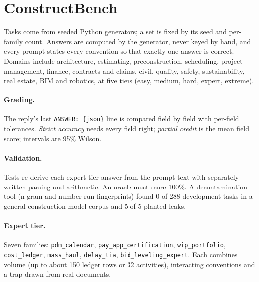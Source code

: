 \documentclass[11pt]{article}
\begin{document}
\section{ConstructBench}
Tasks come from seeded Python generators; a set is fixed by its seed and per-family count. Answers are computed by the generator, never keyed by hand, and every prompt states every convention so that exactly one answer is correct. Domains include architecture, estimating, preconstruction, scheduling, project management, finance, contracts and claims, civil, quality, safety, sustainability, real estate, BIM and robotics, at five tiers (easy, medium, hard, expert, extreme).

\paragraph{Grading.} The reply's last \texttt{ANSWER: \{json\}} line is compared field by field with per-field tolerances. \emph{Strict accuracy} needs every field right; \emph{partial credit} is the mean field score; intervals are 95\% Wilson.

\paragraph{Validation.} Tests re-derive each expert-tier answer from the prompt text with separately written parsing and arithmetic. An oracle must score 100\%. A decontamination tool (n-gram and number-run fingerprints) found 0 of 288 development tasks in a general construction-model corpus and 5 of 5 planted leaks.

\paragraph{Expert tier.} Seven families: \texttt{pdm\_calendar}, \texttt{pay\_app\_certification}, \texttt{wip\_portfolio}, \texttt{cost\_ledger}, \texttt{mass\_haul}, \texttt{delay\_tia}, \texttt{bid\_leveling\_expert}. Each combines volume (up to about 150 ledger rows or 32 activities), interacting conventions and a trap drawn from real documents.
\end{document}
